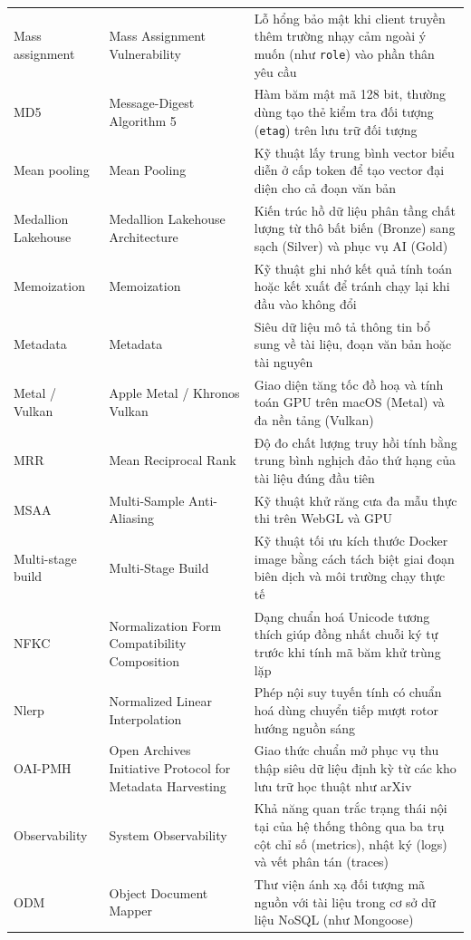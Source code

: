 {\begin{longtable}{@{}>{\raggedright\arraybackslash}p{3.4cm}>{\raggedright\arraybackslash}p{4.7cm}>{\raggedright\arraybackslash}p{7.15cm}@{}}
    Mass assignment & Mass Assignment Vulnerability & Lỗ hổng bảo mật khi client truyền thêm trường nhạy cảm ngoài ý muốn (như \texttt{role}) vào phần thân yêu cầu \\
    MD5 & Message-Digest Algorithm 5 & Hàm băm mật mã 128 bit, thường dùng tạo thẻ kiểm tra đối tượng (\texttt{etag}) trên lưu trữ đối tượng \\
    Mean pooling & Mean Pooling & Kỹ thuật lấy trung bình vector biểu diễn ở cấp token để tạo vector đại diện cho cả đoạn văn bản \\
    Medallion Lakehouse & Medallion Lakehouse Architecture & Kiến trúc hồ dữ liệu phân tầng chất lượng từ thô bất biến (Bronze) sang sạch (Silver) và phục vụ AI (Gold) \\
    Memoization & Memoization & Kỹ thuật ghi nhớ kết quả tính toán hoặc kết xuất để tránh chạy lại khi đầu vào không đổi \\
    Metadata & Metadata & Siêu dữ liệu mô tả thông tin bổ sung về tài liệu, đoạn văn bản hoặc tài nguyên \\
    Metal / Vulkan & Apple Metal / Khronos Vulkan & Giao diện tăng tốc đồ hoạ và tính toán GPU trên macOS (Metal) và đa nền tảng (Vulkan) \\
    MRR & Mean Reciprocal Rank & Độ đo chất lượng truy hồi tính bằng trung bình nghịch đảo thứ hạng của tài liệu đúng đầu tiên \\
    MSAA & Multi-Sample Anti-Aliasing & Kỹ thuật khử răng cưa đa mẫu thực thi trên WebGL và GPU \\
    Multi-stage build & Multi-Stage Build & Kỹ thuật tối ưu kích thước Docker image bằng cách tách biệt giai đoạn biên dịch và môi trường chạy thực tế \\
    NFKC & Normalization Form Compatibility Composition & Dạng chuẩn hoá Unicode tương thích giúp đồng nhất chuỗi ký tự trước khi tính mã băm khử trùng lặp \\
    Nlerp & Normalized Linear Interpolation & Phép nội suy tuyến tính có chuẩn hoá dùng chuyển tiếp mượt rotor hướng nguồn sáng \\
    OAI-PMH & Open Archives Initiative Protocol for Metadata Harvesting & Giao thức chuẩn mở phục vụ thu thập siêu dữ liệu định kỳ từ các kho lưu trữ học thuật như arXiv \\
    Observability & System Observability & Khả năng quan trắc trạng thái nội tại của hệ thống thông qua ba trụ cột chỉ số (metrics), nhật ký (logs) và vết phân tán (traces) \\
    ODM & Object Document Mapper & Thư viện ánh xạ đối tượng mã nguồn với tài liệu trong cơ sở dữ liệu NoSQL (như Mongoose) \\

\end{longtable}}
